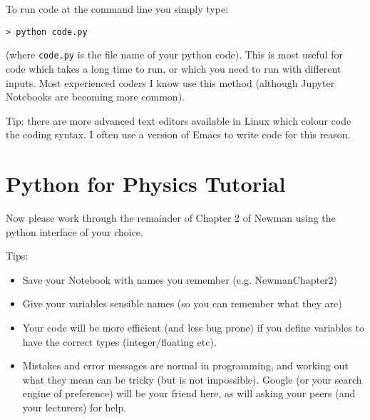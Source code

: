\documentclass[%
 reprint,
 amsmath,amssymb,
 aps,
]{revtex4-1}
\begin{document}
To run code at the command line you simply type: 

\begin{verbatim}
> python code.py
\end{verbatim}

(where {\tt code.py} is the file name of your python code). This is most useful for code which takes a long time to run, or which you need to run with different inputs. Most experienced coders I know use this method (although Jupyter Notebooks are becoming more common). 


Tip: there are more advanced text editors available in Linux which colour code the coding syntax. I often use a version of Emacs to write code for this reason. 



\section{Python for Physics Tutorial}

Now please work through the remainder of Chapter 2 of Newman \citep{newman} using the python interface of your choice. 

Tips: 
\begin{itemize}
\item Save your Notebook with names you remember (e.g. NewmanChapter2) 
\item Give your variables sensible names (so you can remember what they are)
\item Your code will be more efficient (and less bug prone) if you define variables to have the correct types (integer/floating etc). 
\item Mistakes and error messages are normal in programming, and working out what they mean can be tricky (but is not impossible). Google (or your search engine of preference) will be your friend here, as will asking your peers (and your lecturers) for help. 
\end{itemize}

\end{document}
